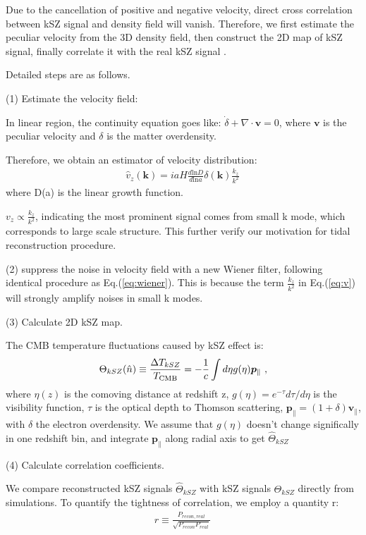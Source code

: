Due to the cancellation of positive and negative velocity, direct cross correlation between kSZ signal and density field will vanish.
Therefore, we first estimate the peculiar velocity from the 3D density field, 
then construct the 2D map of kSZ signal, 
finally correlate it with the real kSZ signal \cite{Shao11}.

Detailed steps are as follows.

(1) Estimate the velocity field:

In linear region, the continuity equation goes like:
$\dot \delta+\nabla \cdot \bm{v}=0$, 
where $\bm{v}$ is the peculiar velocity and $\delta$ is the matter overdensity. 

Therefore, we obtain an estimator of velocity distribution:
\begin{eqnarray}
	\label{eq:v}
\hat v_z(\bm{k})=i a H \frac{d\mathrm{ln}D}{d\mathrm{ln}a}\delta(\bm{k})\frac{k_z}{k^2}\,
\end{eqnarray}
where D(a) is the linear growth function.

$v_z \propto \frac{k_z}{k^2}$, indicating the most prominent signal comes from small k mode, which corresponds to large scale structure. 
This further verify our motivation for tidal reconstruction procedure.

(2) suppress the noise in velocity field with a new Wiener filter, following identical procedure as Eq.(\ref{eq:wiener}). This is because the term $\frac{k_z}{k^2}$ in Eq.(\ref{eq:v}) will strongly amplify noises in small k modes. 

(3) Calculate 2D kSZ map.

The CMB temperature fluctuations caused by kSZ effect is:
\begin{eqnarray}
\label{eq:ksz}
\Theta_{kSZ}(\hat n)\equiv\frac{\Delta T_{kSZ}}{T_{\mathrm{CMB}}}
=-\frac{1}{c}\int d\eta  g(\eta)  \bm{p}_\parallel\ ,
\end{eqnarray}
where $\eta(z)$ is the comoving distance at redshift z, $g(\eta)=e^{-\tau} d\tau/d\eta$ is the visibility function, $\tau$ is the optical depth to Thomson scattering, $\bm{p}_\parallel=(1+\delta)\bm{v}_\parallel$, with $\delta$ the electron overdensity. 
We assume that $g(\eta)$ doesn't change significally in one redshift bin, 
and integrate $\bm{p}_\parallel$ along radial axis to get $\hat \Theta_{kSZ}$

(4) Calculate correlation coefficients.

We compare reconstructed kSZ signals $\hat \Theta_{kSZ}$ with kSZ signals $\Theta_{kSZ}$ directly from simulations. 
To quantify the tightness of correlation, we employ a quantity r: 
\begin{eqnarray}
	r\equiv \frac{P_{recon,real}}{\sqrt{P_{recon}P_{real}}}\,
\end{eqnarray}


